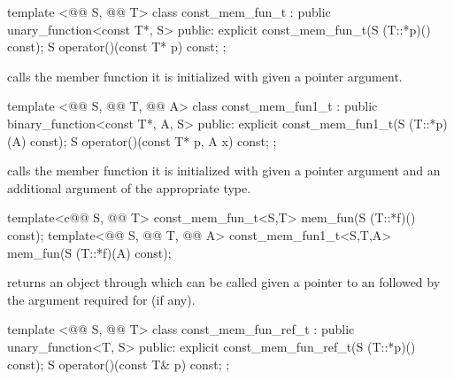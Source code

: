 \documentclass[american,twoside]{book}
\begin{document}
%
\begin{itemdecl}
template <@@ S, @@ T> class const_mem_fun_t
      : public unary_function<const T*, S> {
public:
  explicit const_mem_fun_t(S (T::*p)() const);
  S operator()(const T* p) const;
};
\end{itemdecl}

\begin{itemdescr}
\pnum
{} calls the member function it is initialized with
given a pointer argument.
\end{itemdescr}

%
\begin{itemdecl}
template <@@ S, @@ T, @@ A> class const_mem_fun1_t
      : public binary_function<const T*, A, S> {
public:
  explicit const_mem_fun1_t(S (T::*p)(A) const);
  S operator()(const T* p, A x) const;
};
\end{itemdecl}

\begin{itemdescr}
\pnum
{} calls the member function it is initialized with
given a pointer argument and an additional argument of the appropriate type.
\end{itemdescr}

%
\begin{itemdecl}
template<c@@ S, @@ T> const_mem_fun_t<S,T>
   mem_fun(S (T::*f)() const);
template<@@ S, @@ T, @@ A> const_mem_fun1_t<S,T,A>
   mem_fun(S (T::*f)(A) const);
\end{itemdecl}

\begin{itemdescr}
\pnum
{} returns an object through which  can be
called given a pointer to an  followed by the argument required for
 (if any).
\end{itemdescr}

%
\begin{itemdecl}
template <@@ S, @@ T> class const_mem_fun_ref_t
      : public unary_function<T, S> {
public:
  explicit const_mem_fun_ref_t(S (T::*p)() const);
  S operator()(const T& p) const;
};
\end{itemdecl}
\end{document}
